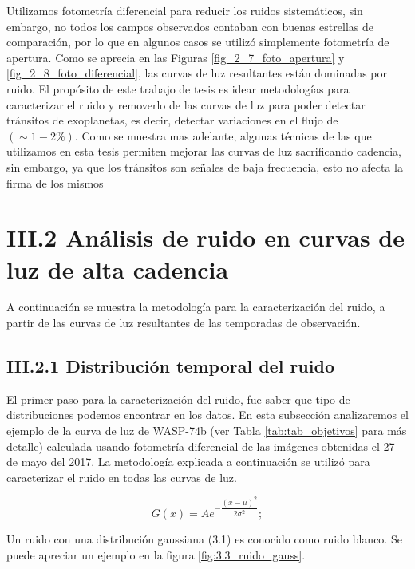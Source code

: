Utilizamos fotometría diferencial para reducir los ruidos sistemáticos, sin embargo, no todos los campos observados contaban con buenas estrellas de comparación, por lo que en algunos casos se utilizó simplemente fotometría de apertura. Como se aprecia en las Figuras \ref{fig_2_7_foto_apertura} y \ref{fig_2_8_foto_diferencial}, las curvas de luz resultantes están dominadas por ruido. El propósito de este trabajo de tesis es idear metodologías para caracterizar el ruido y removerlo de las curvas de luz para poder detectar tránsitos de exoplanetas, es decir, detectar variaciones en el flujo de $(\sim 1-2 \%)$. Como se muestra mas adelante, algunas técnicas de las que utilizamos en esta tesis permiten mejorar las curvas de luz sacrificando cadencia, sin embargo, ya que los tránsitos son señales de baja frecuencia, esto no afecta la firma de los mismos

\section*{III.2 Análisis de ruido en curvas de luz de alta cadencia}

A continuación se muestra la metodología para la caracterización del ruido, a partir de las curvas de luz resultantes de las temporadas de observación.

\subsection*{III.2.1 Distribución temporal del ruido}

El primer paso para la caracterización del ruido, fue saber que tipo de distribuciones podemos encontrar en los datos. En esta subsección analizaremos el ejemplo de la curva de luz de WASP-74b (ver Tabla \ref{tab:tab_objetivos} para más detalle) calculada usando fotometría diferencial de las imágenes obtenidas el 27 de mayo del 2017. La metodología explicada a continuación se utiliz\'o para caracterizar el ruido en todas las curvas de luz.

\begin{equation}
  \displaystyle G(x)=Ae^{-\dfrac{(x-\mu)^{2}}{2\sigma^{2}}};
\end{equation}

Un ruido con una distribución gaussiana (3.1) es conocido como ruido blanco. Se puede apreciar un ejemplo en la figura \ref{fig:3.3_ruido_gauss}.

